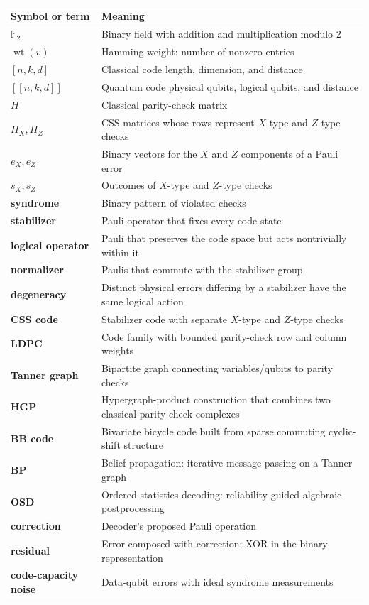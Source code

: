 \documentclass[11pt]{article}
\newcommand{\Ftwo}{\mathbb{F}_2}
\newcommand{\wt}{\operatorname{wt}}
\begin{document}
\begin{longtable}{>{\bfseries}p{}p{}}
\toprule
Symbol or term & Meaning \\
\midrule
\endhead
\(\Ftwo\) & Binary field with addition and multiplication modulo 2 \\
\(\wt(v)\) & Hamming weight: number of nonzero entries \\
\([n,k,d]\) & Classical code length, dimension, and distance \\
\([[n,k,d]]\) & Quantum code physical qubits, logical qubits, and distance \\
\(H\) & Classical parity-check matrix \\
\(H_X,H_Z\) & CSS matrices whose rows represent \(X\)-type and \(Z\)-type checks \\
\(e_X,e_Z\) & Binary vectors for the \(X\) and \(Z\) components of a Pauli error \\
\(s_X,s_Z\) & Outcomes of \(X\)-type and \(Z\)-type checks \\
syndrome & Binary pattern of violated checks \\
stabilizer & Pauli operator that fixes every code state \\
logical operator & Pauli that preserves the code space but acts nontrivially within it \\
normalizer & Paulis that commute with the stabilizer group \\
degeneracy & Distinct physical errors differing by a stabilizer have the same logical action \\
CSS code & Stabilizer code with separate \(X\)-type and \(Z\)-type checks \\
LDPC & Code family with bounded parity-check row and column weights \\
Tanner graph & Bipartite graph connecting variables/qubits to parity checks \\
HGP & Hypergraph-product construction that combines two classical parity-check complexes \\
BB code & Bivariate bicycle code built from sparse commuting cyclic-shift structure \\
BP & Belief propagation: iterative message passing on a Tanner graph \\
OSD & Ordered statistics decoding: reliability-guided algebraic postprocessing \\
correction & Decoder's proposed Pauli operation \\
residual & Error composed with correction; XOR in the binary representation \\
code-capacity noise & Data-qubit errors with ideal syndrome measurements \\
\bottomrule
\end{longtable}
\end{document}
